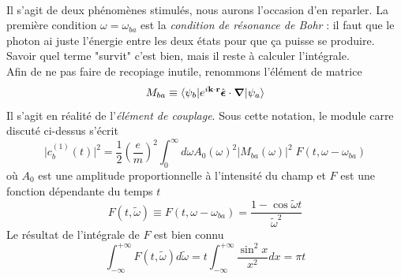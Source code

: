 \ \\

Il s'agit de deux phénomènes stimulés, nous aurons l'occasion d'en reparler. La première 
condition $\omega = \omega_{ba}$ est la \textit{condition de résonance de Bohr} : il faut que
le photon ai juste l'énergie entre les deux états pour que ça puisse se produire. Savoir quel terme
"survit" c'est bien, mais il reste à calculer l'intégrale.\\

Afin de ne pas faire de recopiage inutile, renommons l'élément de matrice
\begin{equation}
M_{ba} \equiv  \langle \psi_b \vert e^{i {\bf k} \cdot {\bf r} }
  \hat{  \mbox{\boldmath $ \epsilon $}} \cdot \mbox{\boldmath $ \nabla $} \vert \psi_a \rangle
\end{equation}
Il s'agit en réalité de l'\textit{élément de couplage}. Sous cette notation, le module carre discuté
ci-dessus s'écrit
\begin{equation}
  \vert c_b^{(1)} (t) \vert ^2 = \frac{1}{2}
\left( \frac{e}{m} \right) ^2
 \int_0^\infty d \omega
  A_0 (\omega) ^2
    \vert M_{ba} (\omega) \vert ^2 \; F(t,\omega - \omega_{ba} )
\end{equation}
où $A_0$ est une amplitude proportionnelle à l'intensité du champ et $F$ est une fonction dépendante
du temps $t$
\begin{equation}
F(t,\tilde{\omega}) \equiv F(t,\omega - \omega_{ba}) 
= \frac{1 - \cos \tilde{\omega} t }{\tilde{\omega}^2}
\end{equation}
Le résultat de l'intégrale de $F$ est bien connu
\begin{equation}
\int_{-\infty}^{+\infty}
F(t, \tilde{\omega}) d\tilde{\omega} = t 
\int_{-\infty}^{+\infty} \frac{\sin^2 x }{x^2} dx = \pi t
\end{equation}

